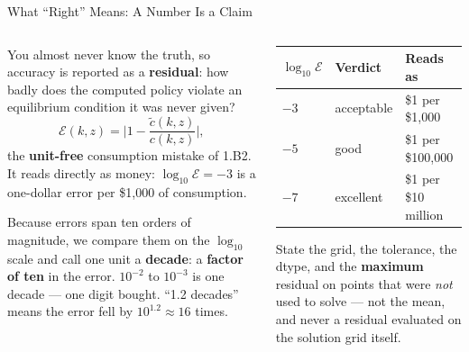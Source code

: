 \begin{frame}{What ``Right'' Means: A Number Is a Claim}
\begin{columns}[T]
\begin{column}{0.50\textwidth}
\small
You almost never know the truth, so accuracy is reported as a \textbf{residual}: how badly does the computed policy violate an equilibrium condition it was never given?
\[
  \mathcal{E}(k,z)=\bigg|1-\frac{\tilde c(k,z)}{c(k,z)}\bigg|,
\]
the \textbf{unit-free} consumption mistake of 1.B2. It reads directly as money: $\log_{10}\mathcal{E}=-3$ is a one-dollar error per \$1{,}000 of consumption.
\vspace{2mm}
\begin{cautionbox}[title=\textbf{``A decade'' --- the unit we report in}]\footnotesize
Because errors span ten orders of magnitude, we compare them on the $\log_{10}$ scale and call one unit a \textbf{decade}: a \textbf{factor of ten} in the error. $10^{-2}$ to $10^{-3}$ is one decade --- one digit bought. ``1.2 decades'' means the error fell by $10^{1.2}\approx16$ times.
\end{cautionbox}
\end{column}
\begin{column}{0.47\textwidth}
\begin{center}\footnotesize
\begin{tabular}{@{}lll@{}}
\toprule
$\log_{10}\mathcal{E}$ & \textbf{Verdict} & \textbf{Reads as} \\
\midrule
$-3$ & acceptable & \$1 per \$1{,}000 \\
$-5$ & good & \$1 per \$100{,}000 \\
$-7$ & excellent & \$1 per \$10 million \\
\bottomrule
\end{tabular}
\end{center}
\medskip
\begin{takeawaybox}[title=\textbf{Reporting standard for this course}]\footnotesize
State the grid, the tolerance, the dtype, and the \textbf{maximum} residual on points that were \emph{not} used to solve --- not the mean, and never a residual evaluated on the solution grid itself.
\end{takeawaybox}
\end{column}
\end{columns}
\vspace{1mm}
\end{frame}

